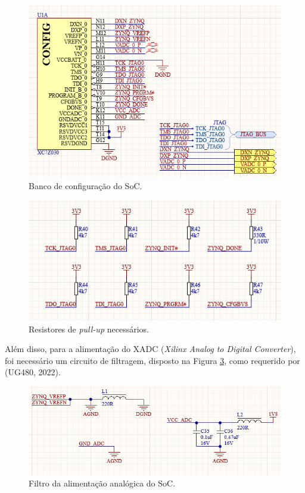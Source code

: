 \begin{figure}[H]
    \centering
    \includegraphics[scale=0.8]{images/zynqconfig.png}
    \caption{Banco de configuração do SoC.}
    \label{fig:config}
\end{figure}

\begin{figure}[H]
    \centering
    \includegraphics[scale=0.8]{images/pullupconfig.png}
    \caption{Resistores de \textit{pull-up} necessários.}
    \label{fig:pullupconfig}
\end{figure}

Além disso, para a alimentação do XADC (\textit{Xilinx Analog to Digital Converter}), foi necessário um circuito de filtragem, disposto na Figura \ref{fig:xadcfilter}, como requerido por (UG480, 2022).

\begin{figure}[H]
    \centering
    \includegraphics[scale=0.8]{images/xadcfilter.png}
    \caption{Filtro da alimentação analógica do SoC.}
    \label{fig:xadcfilter}
\end{figure}


